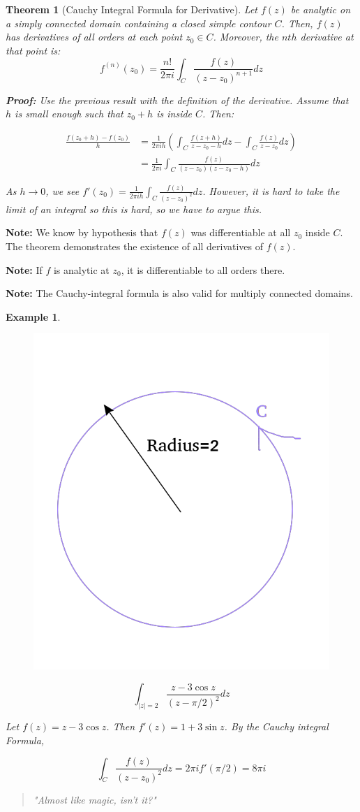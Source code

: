 \documentclass{article}
\newtheorem{theorem}{Theorem}[section]
\newtheorem{ex}{Example}
\theoremstyle{definition}
\begin{document}
\begin{theorem}[Cauchy Integral Formula for Derivative]
Let $f(z)$ be analytic on a simply connected domain containing a closed simple contour $C$. Then, $f(z)$ has derivatives of all orders at each point $z_0 \in C$. Moreover, the $nth$ derivative at that point is:
$$f^{(n)}(z_0) = \frac{n!}{2\pi i } \int_C \frac{f(z)}{(z-z_0)^{n+1}}dz$$

\textbf{Proof:}
Use the previous result with the definition of the derivative. Assume that $h$ is small enough such that $z_0+h$ is inside $C$. Then:

\begin{align*}
\frac{f(z_0+h) - f(z_0)}{h}& = \frac{1}{2\pi i h } \left(\int_C \frac{f(z+h)}{z-z_0-h} dz - \int_C \frac{f(z)}{z-z_0}dz \right)\\
&= \frac{1}{2\pi i } \int_C \frac{f(z)}{(z-z_0)(z-z_0-h)} dz
\end{align*}

As $h \to 0$, we see $f'(z_0) = \frac{1}{2\pi i h } \int_C \frac{f(z)}{(z-z_0)^2} dz$. However, it is hard to take the limit of an integral so this is hard, so we have to argue this.
\end{theorem}

\textbf{Note:} We know by hypothesis that $f(z)$ was differentiable at all $z_0$ inside $C$. The theorem demonstrates the existence of all derivatives of $f(z)$. 

\textbf{Note:} If $f$ is analytic at $z_0$, it is differentiable to all orders there. 

\textbf{Note:} The Cauchy-integral formula is also valid for multiply connected domains.

\begin{ex}
\begin{figure}[H]
	\centering
	\includegraphics[width=0.4\linewidth]{example12}
	\caption{}
	\label{fig:example12}
\end{figure}


$$\int_{|z|=2}\frac{z-3\cos z}{(z-\pi/2)^2}dz$$

Let $f(z) = z-3\cos z$. Then $f'(z) = 1+3 \sin z$. By the Cauchy integral Formula, 

$$\int_{C} \frac{f(z)}{(z-z_0)^2} dz = 2\pi i f'(\pi/2) = 8\pi i $$
\begin{quote}
	"Almost like magic, isn't it?"
\end{quote}
\end{ex}
\end{document}
